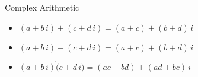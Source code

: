 \documentclass{ximera}
\begin{document}
\begin{definition}

Complex Arithmetic

\begin{itemize}
\item $ (a + b \, i) + (c + d \, i) = (a+c) + (b+d) \, i$
\item $ (a + b \, i) - (c + d \, i) = (a+c) + (b+d) \, i$
\item $ (a + b \, i) \dot (c + d \, i) = (ac-bd) + (ad+bc) \, i$
\end{itemize}


\end{definition}
\end{document}
